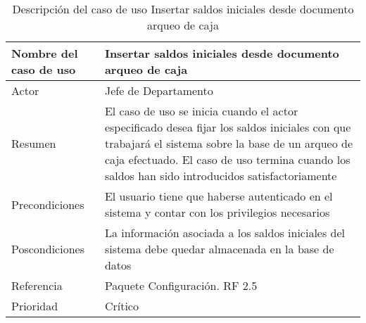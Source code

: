 \begin{table}[H]
	\sf
	\begin{supertabular}{|p{4.5cm}|p{12cm}|}
		\hline
		\textbf{Nombre del caso de uso}
		& \textbf{Insertar saldos iniciales desde documento arqueo de caja} \\ \hline
		
		Actor
		& Jefe de Departamento \\ \hline
		
		Resumen
		& El caso de uso se inicia cuando el actor especificado desea fijar los saldos iniciales con que trabajará el sistema sobre la base de un arqueo de caja efectuado. El caso de uso termina cuando los saldos han sido introducidos satisfactoriamente \\ \hline
		
		Precondiciones
		& El usuario tiene que haberse autenticado en el sistema y contar con los privilegios necesarios \\ \hline
		
		Poscondiciones
		& La información asociada a los saldos iniciales del sistema debe quedar almacenada en la base de datos \\ \hline
		
		Referencia
		& Paquete Configuración. RF 2.5 \\ \hline
		
		Prioridad
		& Crítico \\		
		\hline
	\end{supertabular}
	\caption[Descripción del caso de uso Insertar saldos iniciales desde documento arqueo de caja]{Descripción del caso de uso Insertar saldos iniciales desde documento arqueo de caja}
	\label{table:CU_InsSI}
\end{table}

